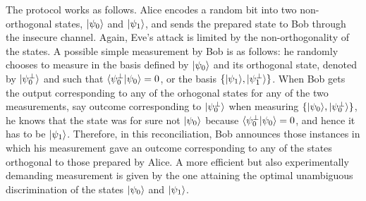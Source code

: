 \documentclass[a4paper]{article}
\begin{document}
The protocol works as follows. Alice encodes a random bit into two non-orthogonal states, $|\psi_0\rangle$ and $|\psi_1\rangle$, and sends the prepared state to Bob through the insecure channel. Again, Eve's attack is limited by the non-orthogonality of the states. A possible simple measurement by Bob is as follows: he randomly chooses to measure in the basis defined by $|\psi_0\rangle$ and its orthogonal state, denoted by $|\psi^\perp_0\rangle$ and such that $\langle \psi^\perp_0|\psi_0\rangle=0$, or the basis $\{|\psi_1\rangle,|\psi^\perp_1\rangle\}$. When Bob gets the output corresponding to any of the orhogonal states for any of the two measurements, say outcome corresponding to $|\psi^\perp_0\rangle$ when measuring $\{|\psi_0\rangle,|\psi^\perp_0\rangle\}$, he knows that the state was for sure not $|\psi_0\rangle$ because $\langle \psi^\perp_0|\psi_0\rangle=0$, and hence it has to be $|\psi_1\rangle$. Therefore, in this reconciliation, Bob announces those instances in which his measurement gave an outcome corresponding to any of the states orthogonal to those prepared by Alice. A more efficient but also experimentally demanding measurement is given by the one attaining the optimal unambiguous discrimination of the states $|\psi_0\rangle$ and $|\psi_1\rangle$. 
\end{document}
